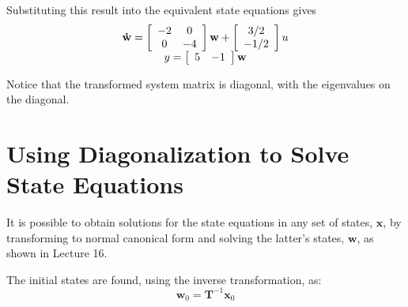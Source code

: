 Substituting this result into the equivalent state equations gives
\[
\begin{array}{c}
 {\bf{\dot w}} = \left[ {\begin{array}{*{20}c}
   { - 2} & 0  \\
   0 & { - 4}  \\
\end{array}} \right]{\bf{w}} + \left[ {\begin{array}{*{20}c}
   {{3 \mathord{\left/
 {\vphantom {3 2}} \right.
 \kern-\nulldelimiterspace} 2}}  \\
   { - {1 \mathord{\left/
 {\vphantom {1 2}} \right.
 \kern-\nulldelimiterspace} 2}}  \\
\end{array}} \right]u \\ 
 y = \left[ {\begin{array}{*{20}c}
   5 & { - 1}  \\
\end{array}} \right]{\bf{w}} \\ 
 \end{array}
\]


Notice that the transformed system matrix is diagonal, with the eigenvalues on the diagonal.

\section*{Using Diagonalization to Solve State Equations}

It is possible to obtain solutions for the state equations in any set of states, $\mathbf{x}$, by transforming to normal canonical form and solving the latter's states, $\mathbf{w}$, as shown in Lecture 16. 

The initial states are found, using the inverse transformation, as:
\[
\mathbf{w}_0=\mathbf{T}^{-1}\mathbf{x}_0
\]

